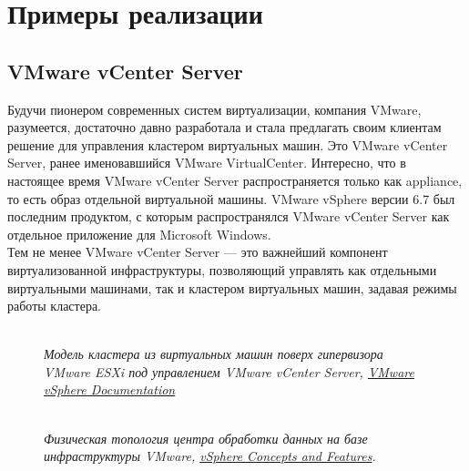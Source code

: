 \documentclass[14pt, a4paper]{article}
\begin{document}
\section*{Примеры реализации} 

\subsection*{VMware vCenter Server} 

Будучи пионером современных систем виртуализации, компания VMware, разумеется, достаточно
давно разработала и стала предлагать своим клиентам решение для управления кластером
виртуальных машин. Это VMware vCenter Server, ранее именовавшийся VMware VirtualCenter.
Интересно, что в настоящее время VMware vCenter Server распространяется только как appliance, то
есть образ отдельной виртуальной машины. VMware vSphere версии 6.7 был последним продуктом, с
которым распространялся VMware vCenter Server как отдельное приложение для Microsoft Windows.\\

Тем не менее VMware vCenter Server — это важнейший компонент виртуализованной
инфраструктуры, позволяющий управлять как отдельными виртуальными машинами, так и кластером
виртуальных машин, задавая режимы работы кластера.\\

\begin{figure}[h]
    \centering
    \\ 
    \small\textit{Модель кластера из виртуальных машин поверх гипервизора VMware ESXi под управлением VMware vCenter
    Server, \href{https://docs.vmware.com/en/VMware-vSphere/index.html}{VMware vSphere Documentation}}  
    \label{framework} 
\end{figure}

\newpage

\begin{figure}[h]
    \centering
    \\ 
    \small\textit{Физическая топология центра обработки данных на базе инфраструктуры VMware,
    \href{https://docs.vmware.com/en/VMware-vSphere/index.html}{vSphere Concepts and Features}.}  
    \label{framework} 
\end{figure}
\end{document}
